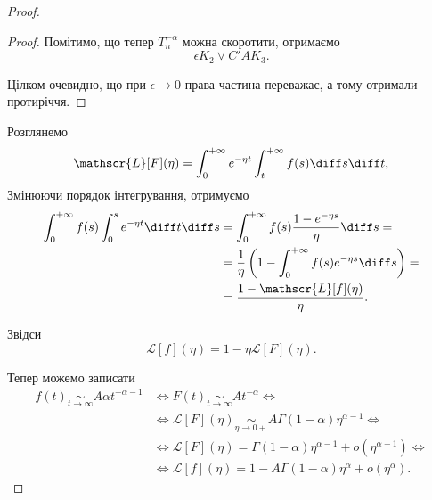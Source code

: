\begin{proof}
\begin{proof}
        Помітимо, що тепер $T_n^{-\alpha}$ можна скоротити, отримаємо
        \begin{equation}
            \epsilon K_2 \lor C' A K_3.
        \end{equation}
        
        Цілком очевидно, що при $\epsilon \to 0$ права частина переважає, а тому отримали протиріччя.
    \end{proof}

    Розглянемо
    \begin{equation}
        \mathscr{L}[F](\eta) = \int_0^{+\infty} e^{-\eta t} \int_t^{+\infty} f(s) \diff s \diff t,
    \end{equation}
    Змінюючи порядок інтегрування, отримуємо
    \begin{equation}
        \begin{aligned}
            \int_0^{+\infty} f(s) \int_0^s e^{-\eta t} \diff t \diff s
            &= \int_0^{+\infty} f(s) \frac{1 - e^{-\eta s}}{\eta} \diff s = \\
            &= \frac{1}{\eta} \left( 1 - \int_0^{+\infty} f(s) e^{-\eta s} \diff s \right) = \\
            &= \frac{1 - \mathscr{L}[f](\eta)}{\eta}.
        \end{aligned}
    \end{equation}

    Звідси
    \begin{equation}
        \mathscr{L}[f](\eta) = 1 - \eta \mathscr{L}[F](\eta).
    \end{equation}

    Тепер можемо записати
    \begin{equation}
        \begin{aligned}
            f(t) \underset{t \to \infty}{\sim} A \alpha t^{-\alpha - 1}
            &\iff F(t) \underset{t \to \infty}{\sim} A t^{-\alpha} \iff \\
            &\iff \mathscr{L}[F](\eta) \underset{\eta \to 0+}{\sim} A \Gamma(1 - \alpha) \eta^{\alpha - 1} \iff \\
            &\iff \mathscr{L}[F](\eta) = \Gamma(1 - \alpha) \eta^{\alpha - 1} + o(\eta^{\alpha - 1}) \iff \\
            &\iff \mathscr{L}[f](\eta) = 1 - A \Gamma(1 - \alpha) \eta^{\alpha} + o(\eta^{\alpha}).
        \end{aligned}
    \end{equation}
\end{proof}

